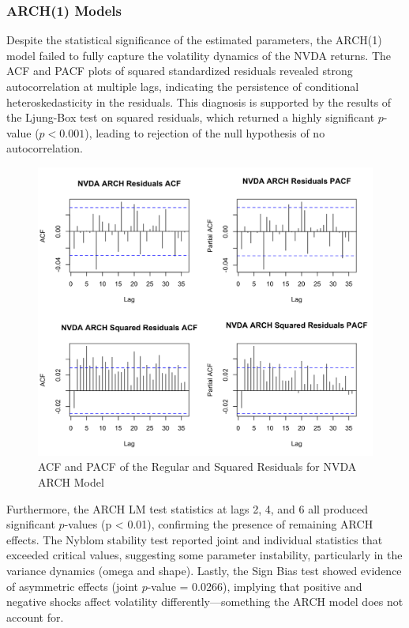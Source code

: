 \documentclass[12pt]{article}
\begin{document}
\subsubsection*{ARCH(1) Models}


Despite the statistical significance of the estimated parameters, the ARCH(1) model failed to fully capture the volatility dynamics of the NVDA returns. The ACF and PACF plots of squared standardized residuals revealed strong autocorrelation at multiple lags, indicating the persistence of conditional heteroskedasticity in the residuals. This diagnosis is supported by the results of the Ljung-Box test on squared residuals, which returned a highly significant $p$-value ($p < 0.001$), leading to rejection of the null hypothesis of no autocorrelation.

\begin{figure}[!h]
	\centering
	\includegraphics[width=0.8\linewidth]{plots/ARCH_NVDA.png}
	\caption{ACF and PACF of the Regular and Squared Residuals for NVDA ARCH Model}
	\label{fig:nvda_arch}
\end{figure}

Furthermore, the ARCH LM test statistics at lags 2, 4, and 6 all produced significant $p$-values (p < 0.01), confirming the presence of remaining ARCH effects. The Nyblom stability test reported joint and individual statistics that exceeded critical values, suggesting some parameter instability, particularly in the variance dynamics (omega and shape). Lastly, the Sign Bias test showed evidence of asymmetric effects (joint $p$-value = 0.0266), implying that positive and negative shocks affect volatility differently—something the ARCH model does not account for.
\end{document}
